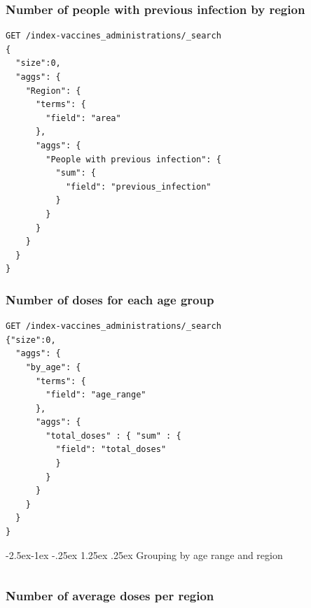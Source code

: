 \documentclass[12pt, a4paper]{article}
\makeatletter
\newcommand\subsubsubsection{\@startsection{paragraph}{4}{\z@} %
                            {-2.5ex\@plus -1ex \@minus -.25ex} %
                            {1.25ex \@plus .25ex} %
                            {\normalfont\normalsize\bfseries}}
\makeatother
\begin{document}
\noindent
\blindtext

\subsubsection{Number of people with previous infection by region}

\begin{tcolorbox}[fontupper=\scriptsize]
    \begin{verbatim}
GET /index-vaccines_administrations/_search
{
  "size":0,
  "aggs": {
    "Region": {
      "terms": {
        "field": "area"
      },
      "aggs": {
        "People with previous infection": {
          "sum": {
            "field": "previous_infection"
          }
        }
      }
    }
  }
}
    \end{verbatim}
\end{tcolorbox}

\noindent
\blindtext

\subsubsection{Number of doses for each age group}

\begin{tcolorbox}[fontupper=\scriptsize]
    \begin{verbatim}
GET /index-vaccines_administrations/_search
{"size":0,
  "aggs": {
    "by_age": {
      "terms": {
        "field": "age_range"
      },
      "aggs": {
        "total_doses" : { "sum" : { 
          "field": "total_doses"
          }
        }
      }
    }
  }
}

    \end{verbatim}
\end{tcolorbox}

\noindent
\blindtext

\subsubsubsection{Grouping by age range and region}

\begin{tcolorbox}[fontupper=\scriptsize]
    \begin{verbatim}
    \end{verbatim}
\end{tcolorbox}

\noindent
\blindtext

\subsubsection{Number of average doses per region}
\end{document}
